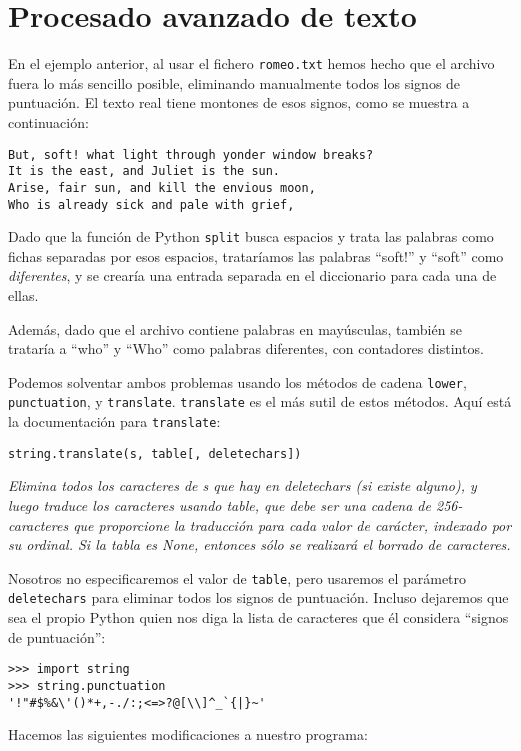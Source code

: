 \section{Procesado avanzado de texto}

En el ejemplo anterior, al usar el fichero {\tt romeo.txt}
hemos hecho que el archivo fuera lo más sencillo posible, eliminando
manualmente todos los signos de puntuación. El texto real
tiene montones de esos signos, como se muestra a continuación:

\beforeverb
\begin{verbatim}
But, soft! what light through yonder window breaks?
It is the east, and Juliet is the sun.
Arise, fair sun, and kill the envious moon,
Who is already sick and pale with grief,
\end{verbatim}
\afterverb
%
Dado que la función de Python {\tt split} busca espacios y
trata las palabras como fichas separadas por esos espacios, trataríamos
las palabras ``soft!'' y ``soft'' como \emph{diferentes}, y se crearía
una entrada separada en el diccionario para cada una de ellas.

Además, dado que el archivo contiene palabras en mayúsculas, también se
trataría a ``who'' y ``Who'' como palabras diferentes, con contadores
distintos.

Podemos solventar ambos problemas usando los métodos
de cadena {\tt lower}, {\tt punctuation}, y {\tt translate}.
{\tt translate} es el más sutil de estos métodos.
Aquí está la documentación para {\tt translate}:

\verb"string.translate(s, table[, deletechars])"

\emph{Elimina todos los caracteres de s que hay en deletechars (si existe alguno),
y luego traduce los caracteres usando table, que debe ser una cadena
de 256-caracteres que proporcione la traducción para cada
valor de carácter, indexado por su ordinal. Si la tabla es None,
entonces sólo se realizará el borrado de caracteres.}

Nosotros no especificaremos el valor de {\tt table}, pero usaremos
el parámetro {\tt deletechars} para eliminar todos los signos de puntuación.
Incluso dejaremos que sea el propio Python quien nos diga la lista de caracteres
que él considera ``signos de puntuación'':

\beforeverb
\begin{verbatim}
>>> import string
>>> string.punctuation
'!"#$%&\'()*+,-./:;<=>?@[\\]^_`{|}~'
\end{verbatim}
\afterverb
%
Hacemos las siguientes modificaciones a nuestro programa:


